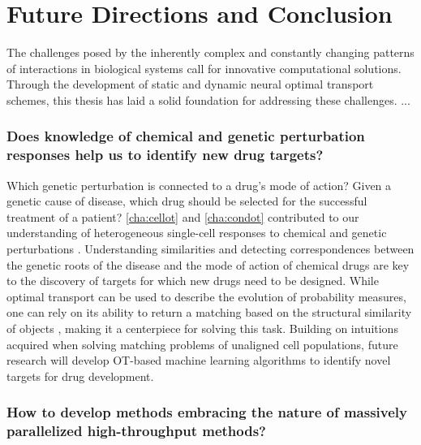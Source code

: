 \section*{Future Directions and Conclusion}

The challenges posed by the inherently complex and constantly changing patterns of interactions in biological systems call for innovative computational solutions. Through the development of static and dynamic neural optimal transport schemes, this thesis has laid a solid foundation for addressing these challenges.
...

\subsubsection*{\textbf{Does knowledge of chemical and genetic perturbation responses help us to identify new drug targets?}}

Which genetic perturbation is connected to a drug's mode of action? Given a genetic cause of disease, which drug should be selected for the successful treatment of a patient?
\cref{cha:cellot} and \cref{cha:condot} contributed to our understanding of heterogeneous single-cell responses to chemical and genetic perturbations \citep[]{bunne2019learning, bunne2022supervised}.
Understanding similarities and detecting correspondences between the genetic roots of the disease and the mode of action of chemical drugs are key to the discovery of targets for which new drugs need to be designed.
While optimal transport can be used to describe the evolution of probability measures, one can rely on its ability to return a matching based on the structural similarity of objects \citep{bunne2019learning}, making it a centerpiece for solving this task.
Building on intuitions acquired when solving matching problems of unaligned cell populations, future research will develop OT-based machine learning algorithms to identify novel targets for drug development.


\subsubsection*{\textbf{How to develop methods embracing the nature of massively parallelized high-throughput methods?}}

